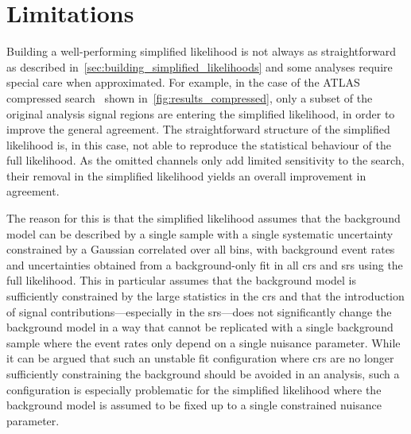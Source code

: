 \section{Limitations}\label{sec:simplify_limitations}

Building a well-performing simplified likelihood is not always as straightforward as described in~\cref{sec:building_simplified_likelihoods} and some analyses require special care when approximated. For example, in the case of the ATLAS compressed search~\cite{SUSY-2018-16} shown in~\cref{fig:results_compressed}, only a subset of the original analysis signal regions are entering the simplified likelihood, in order to improve the general agreement. The straightforward structure of the simplified likelihood is, in this case, not able to reproduce the statistical behaviour of the full likelihood. As the omitted channels only add limited sensitivity to the search, their removal in the simplified likelihood yields an overall improvement in agreement. 

The reason for this is that the simplified likelihood assumes that the background model can be described by a single sample with a single systematic uncertainty constrained by a Gaussian correlated over all bins, with background event rates and uncertainties obtained from a background-only fit in all \glspl{cr} and \glspl{sr} using the full likelihood. This in particular assumes that the background model is sufficiently constrained by the large statistics in the \glspl{cr} and that the introduction of signal contributions---especially in the \glspl{sr}---does not significantly change the background model in a way that cannot be replicated with a single background sample where the event rates only depend on a single nuisance parameter. While it can be argued that such an unstable fit configuration where \glspl{cr} are no longer sufficiently constraining the background should be avoided in an analysis, such a configuration is especially problematic for the simplified likelihood where the background model is assumed to be fixed up to a single constrained nuisance parameter.


